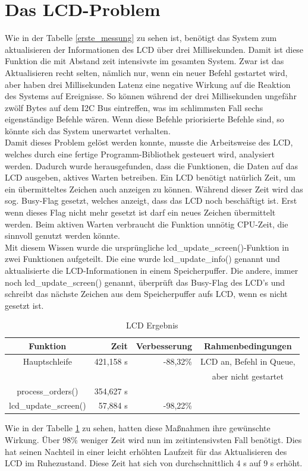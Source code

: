 \section{Das LCD-Problem}
Wie in der Tabelle \ref{erste_messung} zu sehen ist, benötigt das System zum aktualisieren der Informationen
des LCD über drei Millisekunden. Damit ist diese Funktion die mit Abstand zeit intensivste im gesamten System.
Zwar ist das Aktualisieren recht selten, nämlich nur, wenn ein neuer Befehl gestartet wird, aber haben drei
Millisekunden Latenz eine negative Wirkung auf die Reaktion des Systems auf Ereignisse. So können während
der drei Millisekunden ungefähr zwölf Bytes auf dem I2C Bus eintreffen, was im schlimmsten Fall sechs eigenständige
Befehle wären. Wenn diese Befehle priorisierte Befehle sind, so könnte sich das System unerwartet verhalten.\\
Damit dieses Problem gelöst werden konnte, musste die Arbeitsweise des LCD, welches durch eine fertige Programm-Bibliothek
gesteuert wird, analysiert werden. Dadurch wurde herausgefunden, dass die Funktionen, die Daten auf das LCD ausgeben,
aktives Warten betreiben. Ein LCD benötigt natürlich Zeit, um ein übermitteltes Zeichen auch anzeigen zu können.
Während dieser Zeit wird das sog. Busy-Flag gesetzt, welches anzeigt, dass das LCD noch beschäftigt ist. Erst
wenn dieses Flag nicht mehr gesetzt ist darf ein neues Zeichen übermittelt werden. Beim aktiven Warten verbraucht die
Funktion unnötig CPU-Zeit, die sinnvoll genutzt werden könnte.\\
Mit diesem Wissen wurde die ursprüngliche lcd\_\-update\_\-screen()-Funktion in zwei Funktionen aufgeteilt. Die eine
wurde lcd\_\-update\_\-info() genannt und aktualisierte die LCD-Informationen in einem Speicherpuffer. Die andere,
immer noch lcd\_\-update\_\-screen() genannt, überprüft das Busy-Flag des LCD's und schreibt das nächste Zeichen aus
dem Speicherpuffer aufs LCD, wenn es nicht gesetzt ist.
\begin{table}[htb]
\begin{center}
	\begin{tabular}{|c||r|r|c|}
		\hline
		\textbf{Funktion} & \textbf{Zeit} & \textbf{Verbesserung} & \textbf{Rahmenbedingungen} \\ \hline \hline
		Hauptschleife & 421,158 \textmu{}s & -88,32\% & LCD an, Befehl in Queue,\\
		& & & aber nicht gestartet \\ \hline
		process\_orders() & 354,627 \textmu{}s & & \\ \hline
		lcd\_update\_screen() & 57,884 \textmu{}s & -98,22\% & \\ \hline
	\end{tabular}
	\caption{\label{lcd_opt} LCD Ergebnis}
\end{center}
\end{table}
Wie in der Tabelle \ref{lcd_opt} zu sehen, hatten diese Maßnahmen ihre gewünschte Wirkung. Über 98\% weniger Zeit
wird nun im zeitintensivsten Fall benötigt. Dies hat seinen Nachteil in einer leicht erhöhten Laufzeit für das
Aktualisieren des LCD im Ruhezustand. Diese Zeit hat sich von durchschnittlich 4 \textmu{}s auf 9 \textmu{}s erhöht.
